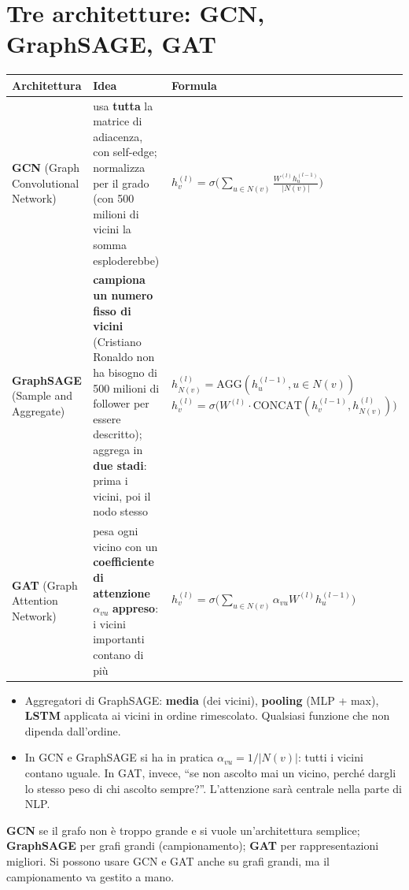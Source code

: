 \section{Tre architetture: GCN, GraphSAGE, GAT}
\begin{center}
\small
\renewcommand{\arraystretch}{1.5}
\begin{tabularx}{\textwidth}{l X X}
\toprule
\textbf{Architettura} & \textbf{Idea} & \textbf{Formula}\\
\midrule
\textbf{GCN} \newline (Graph Convolutional Network) & usa \textbf{tutta} la matrice di adiacenza, con self-edge; normalizza per il grado (con 500 milioni di vicini la somma esploderebbe) & $h_v^{(l)} = \sigma\Big(\sum_{u\in N(v)} \frac{W^{(l)}h_u^{(l-1)}}{|N(v)|}\Big)$\\
\textbf{GraphSAGE} \newline (Sample and Aggregate) & \textbf{campiona un numero fisso di vicini} (Cristiano Ronaldo non ha bisogno di 500 milioni di follower per essere descritto); aggrega in \textbf{due stadi}: prima i vicini, poi il nodo stesso & $h_{N(v)}^{(l)} = \mathrm{AGG}(h_u^{(l-1)}, u\in N(v))$\newline $h_v^{(l)} = \sigma\big(W^{(l)}\cdot\mathrm{CONCAT}(h_v^{(l-1)}, h_{N(v)}^{(l)})\big)$\\
\textbf{GAT} \newline (Graph Attention Network) & pesa ogni vicino con un \textbf{coefficiente di attenzione} $\alpha_{vu}$ \textbf{appreso}: i vicini importanti contano di più & $h_v^{(l)} = \sigma\Big(\sum_{u\in N(v)}\alpha_{vu}W^{(l)}h_u^{(l-1)}\Big)$\\
\bottomrule
\end{tabularx}
\end{center}
\begin{itemize}
  \item Aggregatori di GraphSAGE: \textbf{media} (dei vicini), \textbf{pooling} (MLP + max), \textbf{LSTM} applicata ai vicini in ordine
        rimescolato. Qualsiasi funzione che non dipenda dall'ordine.
  \item In GCN e GraphSAGE si ha in pratica $\alpha_{vu} = 1/|N(v)|$: tutti i vicini contano uguale. In GAT, invece, ``se non ascolto mai
        un vicino, perché dargli lo stesso peso di chi ascolto sempre?''. L'attenzione sarà centrale nella parte di NLP.
\end{itemize}
\begin{sintesi}
\textbf{GCN} se il grafo non è troppo grande e si vuole un'architettura semplice; \textbf{GraphSAGE} per grafi grandi (campionamento);
\textbf{GAT} per rappresentazioni migliori. Si possono usare GCN e GAT anche su grafi grandi, ma il campionamento va gestito a mano.
\end{sintesi}


